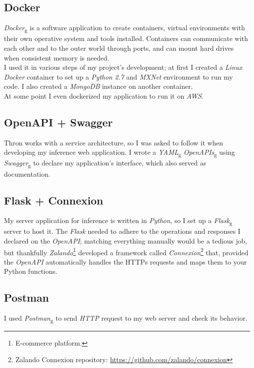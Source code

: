\subsection*{Docker}
\emph{\gls{Docker}}\textsubscript{g} is a software application to create containers, virtual environments with their own operative system and tools installed. Containers can communicate with each other and to the outer world through ports, and can mount hard drives when consistent memory is needed. \\
I used it in various steps of my project's development; at first I created a \emph{Linux} \emph{Docker} container to set up a \emph{Python 2.7} and \emph{MXNet} environment to run my code. I also created a \emph{MongoDB} instance on another container. \\
At some point I even dockerized my application to run it on \emph{AWS}.


\subsection*{OpenAPI + Swagger}
Thron works with a service architecture, so I was asked to follow it when developing my inference web application. I wrote a \emph{\gls{YAML}}\textsubscript{g} \emph{\gls{OpenAPI}s}\textsubscript{g} using \emph{\gls{Swagger}}\textsubscript{g} to declare my application's interface, which also served as documentation.

\subsection*{Flask + Connexion}
My server application for inference is written in \emph{Python}, so I set up a \emph{\gls{Flask}}\textsubscript{g} server to host it. The \emph{Flask} needed to adhere to the operations and responses I declared on the \emph{OpenAPI}; matching everything manually would be a tedious job, but thankfully \emph{Zalando}\footnote{E-commerce platform.} developed a framework called \emph{Connexion}\footnote{Zalando Connexion repository: \url{https://github.com/zalando/connexion}} that, provided the \emph{OpenAPI} automatically handles the HTTPs requests and maps them to your Python functions.

\subsection*{Postman}
I used \emph{\gls{Postman}}\textsubscript{g} to send \emph{HTTP} request to my web server and check its behavior.

